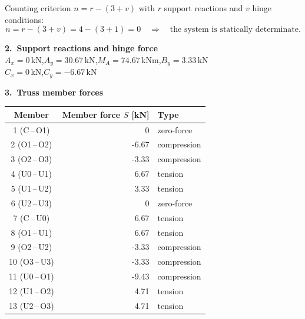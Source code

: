 \documentclass[a4paper,11pt]{article}
\begin{document}
Counting criterion $n = r - (3 + v)$ with $r$ support reactions and $v$ hinge conditions:
\[ n = r - (3+v) = 4 - (3+1) = 0 \quad\Rightarrow\quad \text{the system is statically determinate.} \]
\par\medskip\textbf{2.\ Support reactions and hinge force}\\[-2pt]
$A_x = 0$\,kN,\quad $A_y = 30.67$\,kN,\quad $M_A = 74.67$\,kNm,\quad $B_y = 3.33$\,kN\\[2pt]$C_x = 0$\,kN,\quad $C_y = -6.67$\,kN\par
\par\medskip\textbf{3.\ Truss member forces}\par
\begin{center}\renewcommand{\arraystretch}{1.15}
\begin{tabular}{c r l}
\toprule
Member & Member force $S$ [kN] & Type \\
\midrule
  1 (C\,--\,O1) & 0 & zero-force \\
  2 (O1\,--\,O2) & -6.67 & compression \\
  3 (O2\,--\,O3) & -3.33 & compression \\
  4 (U0\,--\,U1) & 6.67 & tension \\
  5 (U1\,--\,U2) & 3.33 & tension \\
  6 (U2\,--\,U3) & 0 & zero-force \\
  7 (C\,--\,U0) & 6.67 & tension \\
  8 (O1\,--\,U1) & 6.67 & tension \\
  9 (O2\,--\,U2) & -3.33 & compression \\
  10 (O3\,--\,U3) & -3.33 & compression \\
  11 (U0\,--\,O1) & -9.43 & compression \\
  12 (U1\,--\,O2) & 4.71 & tension \\
  13 (U2\,--\,O3) & 4.71 & tension \\
\bottomrule
\end{tabular}\end{center}
\end{document}
